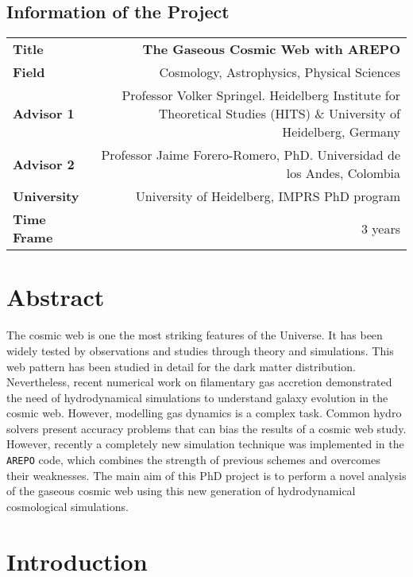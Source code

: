 \documentclass[a4,useAMS,usenatbib,usegraphicx,12pt]{article}
\begin{document}
\subsection*{Information of the Project}
\begin{tabular}{L!{\VRule}R}
\bf Title		& \bf The Gaseous Cosmic Web with AREPO\\
\bf Field		& Cosmology, Astrophysics, Physical Sciences \\
\bf Advisor 1	& Professor Volker Springel. Heidelberg Institute for Theoretical Studies (HITS) 
\& University of Heidelberg, Germany \\
\bf Advisor 2	& Professor Jaime Forero-Romero, PhD. Universidad de los Andes, Colombia \\
\bf University	& University of Heidelberg, IMPRS PhD program \\
\bf Time Frame	& 3 years \\
\end{tabular}
\normalsize


\section{Abstract}


The cosmic web is one the most striking features of the Universe. It
has been widely tested by observations and studies through theory and
simulations. This web pattern has been studied in detail for the dark
matter distribution. Nevertheless, recent numerical work on
filamentary gas accretion demonstrated the need of hydrodynamical
simulations to understand galaxy evolution in the cosmic web. 
However, modelling gas dynamics is a complex task. Common hydro
solvers present accuracy problems that can bias the results of a
cosmic web study. However, recently a completely new simulation technique
was implemented in the \texttt{AREPO} code, which combines the
strength of previous schemes and overcomes their weaknesses. The main
aim of this PhD project is to perform a novel analysis of the
gaseous cosmic web using this new generation of hydrodynamical cosmological
simulations. 


\newpage

\section{Introduction}
\end{document}
